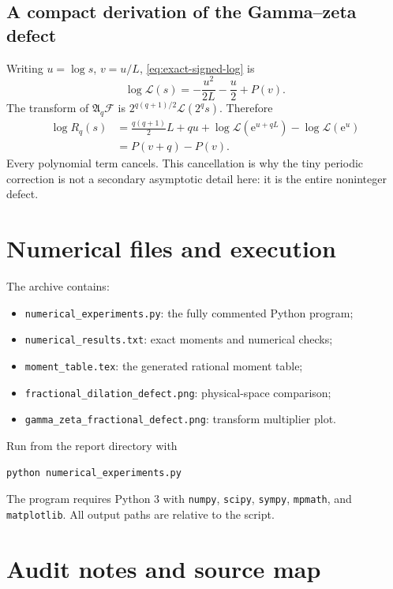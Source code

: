 \documentclass[11pt]{article}
\theoremstyle{definition}
\theoremstyle{remark}
\newcommand{\e}{\mathrm e}
\newcommand{\extF}{\mathcal F}
\newcommand{\Aop}{\mathfrak A}
\begin{document}
\subsection{A compact derivation of the Gamma--zeta defect}

Writing $u=\log s$, $v=u/L$, \cref{eq:exact-signed-log} is
\[
 \log\mathscr L(s)=-\frac{u^2}{2L}-\frac u2+P(v).
\]
The transform of $\Aop_q\extF$ is
$2^{q(q+1)/2}\mathscr L(2^qs)$.  Therefore
\begin{align*}
 \log R_q(s)
 &=\frac{q(q+1)}2L+qu
   +\log\mathscr L(\e^{u+qL})-\log\mathscr L(\e^u)\\
 &=P(v+q)-P(v).
\end{align*}
Every polynomial term cancels.  This cancellation is why the tiny periodic correction is not a
secondary asymptotic detail here: it is the entire noninteger defect.

\section{Numerical files and execution}
\label{app:numerical-files}

The archive contains:
\begin{itemize}
\item \texttt{numerical\_experiments.py}: the fully commented Python program;
\item \texttt{numerical\_results.txt}: exact moments and numerical checks;
\item \texttt{moment\_table.tex}: the generated rational moment table;
\item \texttt{fractional\_dilation\_defect.png}: physical-space comparison;
\item \texttt{gamma\_zeta\_fractional\_defect.png}: transform multiplier plot.
\end{itemize}

Run from the report directory with
\begin{lstlisting}[language=bash]
python numerical_experiments.py
\end{lstlisting}
The program requires Python 3 with \texttt{numpy}, \texttt{scipy}, \texttt{sympy},
\texttt{mpmath}, and \texttt{matplotlib}.  All output paths are relative to the script.

\section{Audit notes and source map}
\label{app:audit-map}
\end{document}
